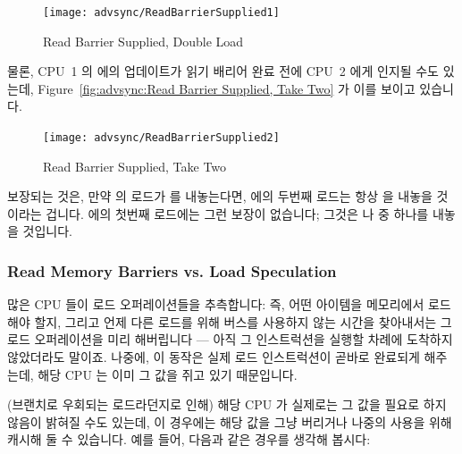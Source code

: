 \begin{enumerate}
\begin{figure}[htbp]
\centering
\texttt{[image: advsync/ReadBarrierSupplied1]}
\caption{Read Barrier Supplied, Double Load}
\end{figure}

물론, CPU~1 의  에의 업데이트가 읽기 배리어 완료 전에 CPU~2 에게 인지될
수도 있는데, Figure~\ref{fig:advsync:Read Barrier Supplied, Take Two} 가 이를
보이고 있습니다.

\begin{figure}[htbp]
\centering
\texttt{[image: advsync/ReadBarrierSupplied2]}
\caption{Read Barrier Supplied, Take Two}
\end{figure}

보장되는 것은, 만약  의 로드가  를 내놓는다면,  에의
두번째 로드는 항상  을 내놓을 것이라는 겁니다.
 에의 첫번째 로드에는 그런 보장이 없습니다; 그것은  나
 중 하나를 내놓을 것입니다.

\subsubsection{Read Memory Barriers vs. Load Speculation}
\label{sec:advsync:Read Memory Barriers vs. Load Speculation}

많은 CPU 들이 로드 오퍼레이션들을 추측합니다: 즉, 어떤 아이템을 메모리에서
로드해야 할지, 그리고 언제 다른 로드를 위해 버스를 사용하지 않는 시간을
찾아내서는 그 로드 오퍼레이션을 미리 해버립니다 --- 아직 그 인스트럭션을 실행할
차례에 도착하지 않았더라도 말이죠.
나중에, 이 동작은 실제 로드 인스트럭션이 곧바로 완료되게 해주는데, 해당 CPU 는
이미 그 값을 쥐고 있기 때문입니다.

(브랜치로 우회되는 로드라던지로 인해) 해당 CPU 가 실제로는 그 값을 필요로 하지
않음이 밝혀질 수도 있는데, 이 경우에는 해당 값을 그냥 버리거나 나중의 사용을
위해 캐시해 둘 수 있습니다.
예를 들어, 다음과 같은 경우를 생각해 봅시다:
\iffalse


\end{enumerate}
